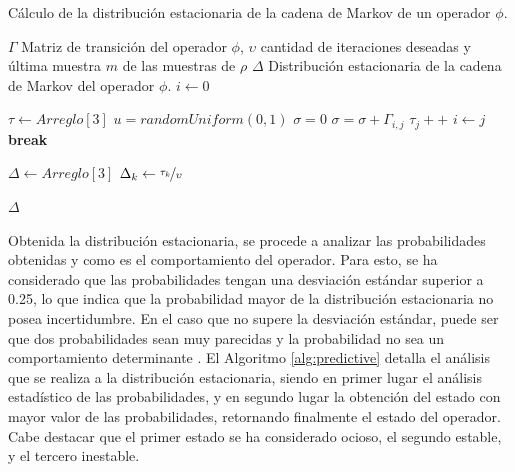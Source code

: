\begin{algorithm}[!ht]
	\caption{Cálculo de la distribución estacionaria de la cadena de Markov de un operador $\phi$.}
	\label{alg:distEstacionaria}
	\begin{algorithmic}[1]
	\REQUIRE $\Gamma$ Matriz de transición del operador $\phi$, $\upsilon$ cantidad de iteraciones deseadas y última muestra $m$ de las muestras de $\rho$
	\ENSURE $\Delta$ Distribución estacionaria de la cadena de Markov del operador $\phi$.
	\STATE $i \leftarrow 0$ 
	\ELSE
	\ENDIF
	
	\STATE $\tau \leftarrow Arreglo[3]$ 
		\STATE $u = randomUniform(0,1)$
		\STATE $\sigma = 0$
			\STATE $\sigma = \sigma + \Gamma_{i,j}$
				\STATE $\tau_{j}++$
				\STATE $i \leftarrow j$
				\STATE \textbf{break}
			\ENDIF
		\ENDFOR
	\ENDFOR

	\STATE $\Delta \leftarrow Arreglo[3]$ 
		\STATE $\Delta_{k} \leftarrow \nicefrac{\tau_{k}}{\upsilon}$
	\ENDFOR	
	
	\RETURN $\Delta$
	
	\end{algorithmic}
\end{algorithm}

Obtenida la distribución estacionaria, se procede a analizar las probabilidades obtenidas y como es el comportamiento del operador. Para esto, se ha considerado que las probabilidades tengan una desviación estándar superior a 0.25, lo que indica que la probabilidad mayor de la distribución estacionaria no posea incertidumbre. En el caso que no supere la desviación estándar, puede ser que dos probabilidades sean muy parecidas y la probabilidad no sea un comportamiento determinante \citep{soong2004fundamentals}. El Algoritmo \ref{alg:predictive} detalla el análisis que se realiza a la distribución estacionaria, siendo en primer lugar el análisis estadístico de las probabilidades, y en segundo lugar la obtención del estado con mayor valor de las probabilidades, retornando finalmente el estado del operador. Cabe destacar que el primer estado se ha considerado ocioso, el segundo estable, y el tercero inestable.

